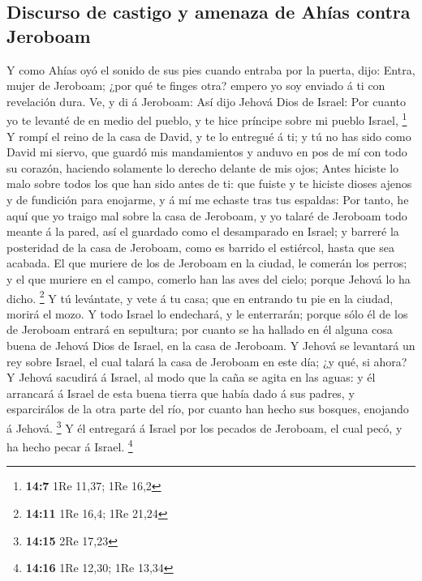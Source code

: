 \hypertarget{discurso-de-castigo-y-amenaza-de-ahuxedas-contra-jeroboam}{%
\subsection{Discurso de castigo y amenaza de Ahías contra
Jeroboam}\label{discurso-de-castigo-y-amenaza-de-ahuxedas-contra-jeroboam}}

 Y como Ahías oyó el sonido de sus pies cuando entraba por
la puerta, dijo: Entra, mujer de Jeroboam; ¿por qué te finges otra?
empero yo soy enviado á ti con revelación dura.  Ve, y di á
Jeroboam: Así dijo Jehová Dios de Israel: Por cuanto yo te levanté de en
medio del pueblo, y te hice príncipe sobre mi pueblo Israel, \footnote{\textbf{14:7}
  1Re 11,37; 1Re 16,2}  Y rompí el reino de la casa de
David, y te lo entregué á ti; y tú no has sido como David mi siervo, que
guardó mis mandamientos y anduvo en pos de mí con todo su corazón,
haciendo solamente lo derecho delante de mis ojos;  Antes
hiciste lo malo sobre todos los que han sido antes de ti: que fuiste y
te hiciste dioses ajenos y de fundición para enojarme, y á mí me echaste
tras tus espaldas:  Por tanto, he aquí que yo traigo mal
sobre la casa de Jeroboam, y yo talaré de Jeroboam todo meante á la
pared, así el guardado como el desamparado en Israel; y barreré la
posteridad de la casa de Jeroboam, como es barrido el estiércol, hasta
que sea acabada.  El que muriere de los de Jeroboam en la
ciudad, le comerán los perros; y el que muriere en el campo, comerlo han
las aves del cielo; porque Jehová lo ha dicho. \footnote{\textbf{14:11}
  1Re 16,4; 1Re 21,24}  Y tú levántate, y vete á tu casa;
que en entrando tu pie en la ciudad, morirá el mozo.  Y
todo Israel lo endechará, y le enterrarán; porque sólo él de los de
Jeroboam entrará en sepultura; por cuanto se ha hallado en él alguna
cosa buena de Jehová Dios de Israel, en la casa de Jeroboam.
 Y Jehová se levantará un rey sobre Israel, el cual talará
la casa de Jeroboam en este día; ¿y qué, si ahora?  Y
Jehová sacudirá á Israel, al modo que la caña se agita en las aguas: y
él arrancará á Israel de esta buena tierra que había dado á sus padres,
y esparcirálos de la otra parte del río, por cuanto han hecho sus
bosques, enojando á Jehová. \footnote{\textbf{14:15} 2Re 17,23}
 Y él entregará á Israel por los pecados de Jeroboam, el
cual pecó, y ha hecho pecar á Israel. \footnote{\textbf{14:16} 1Re
  12,30; 1Re 13,34}

